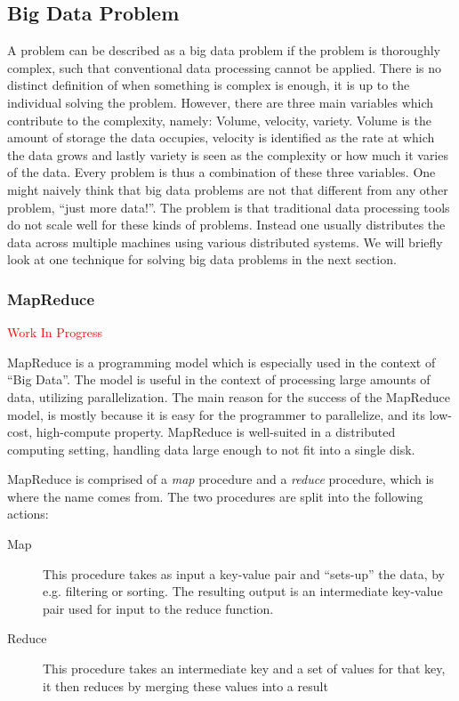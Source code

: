 \subsection{Big Data Problem}
A problem can be described as a big data problem if the problem is thoroughly complex, such that conventional data processing cannot be applied. There is no distinct definition of when something is complex is enough, it is up to the individual solving the problem. However, there are three main variables which contribute to the complexity, namely: Volume, velocity, variety. Volume is the amount of storage the data occupies, velocity is identified as the rate at which the data grows and lastly variety is seen as the complexity or how much it varies of the data. 
Every problem is thus a combination of these three variables. One might naively think that big data problems are not that different from any other problem, ``just more data!''. The problem is that traditional data processing tools do not scale well for these kinds of problems. Instead one usually distributes the data across multiple machines using various distributed systems. We will briefly look at one technique for solving big data problems in the next section.

\subsubsection{MapReduce} %
\label{sec:mapreduce_programming_model}
\textcolor{red}{Work In Progress}

MapReduce is a programming model which is especially used in the context of ``Big Data''. The model is useful in the context of processing large amounts of data, utilizing parallelization. The main reason for the success of the MapReduce model, is mostly because it is easy for the programmer to parallelize, and its low-cost, high-compute property. MapReduce is well-suited in a distributed computing setting, handling data large enough to not fit into a single disk.

MapReduce is comprised of a \emph{map} procedure and a \emph{reduce} procedure, which is where the name comes from. The two procedures are split into the following actions:


\begin{description}
    \item[Map] This procedure takes as input a key-value pair and ``sets-up'' the data, by e.g. filtering or sorting. The resulting output is an intermediate key-value pair used for input to the reduce function.
    \item[Reduce] This procedure takes an intermediate key and a set of values for that key, it then reduces by merging these values into a result
\end{description}

